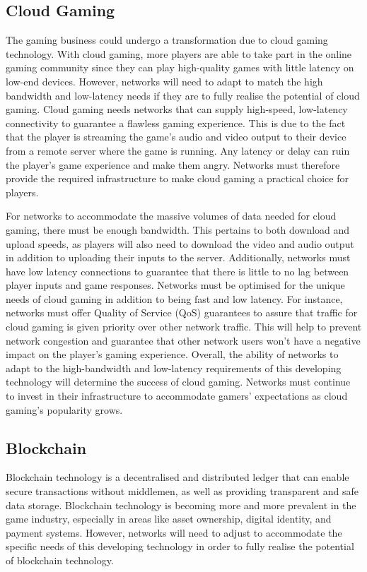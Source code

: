 \subsection{Cloud Gaming}
The gaming business could undergo a transformation due to cloud gaming technology. With cloud gaming, more players are able to take part in the online gaming community since they can play high-quality games with little latency on low-end devices. However, networks will need to adapt to match the high bandwidth and low-latency needs if they are to fully realise the potential of cloud gaming.\cite{lopezcloudgaming}
Cloud gaming needs networks that can supply high-speed, low-latency connectivity to guarantee a flawless gaming experience. This is due to the fact that the player is streaming the game's audio and video output to their device from a remote server where the game is running. Any latency or delay can ruin the player's game experience and make them angry. Networks must therefore provide the required infrastructure to make cloud gaming a practical choice for players.\cite{lopezcloudgaming}

For networks to accommodate the massive volumes of data needed for cloud gaming, there must be enough bandwidth. This pertains to both download and upload speeds, as players will also need to download the video and audio output in addition to uploading their inputs to the server. Additionally, networks must have low latency connections to guarantee that there is little to no lag between player inputs and game responses.\cite{lopezcloudgaming}
Networks must be optimised for the unique needs of cloud gaming in addition to being fast and low latency. For instance, networks must offer Quality of Service (QoS) guarantees to assure that traffic for cloud gaming is given priority over other network traffic. This will help to prevent network congestion and guarantee that other network users won't have a negative impact on the player's gaming experience.\cite{lopezcloudgaming}
Overall, the ability of networks to adapt to the high-bandwidth and low-latency requirements of this developing technology will determine the success of cloud gaming. Networks must continue to invest in their infrastructure to accommodate gamers' expectations as cloud gaming's popularity grows.\cite{lopezcloudgaming}

\subsection{Blockchain}
Blockchain technology is a decentralised and distributed ledger that can enable secure transactions without middlemen, as well as providing transparent and safe data storage. Blockchain technology is becoming more and more prevalent in the game industry, especially in areas like asset ownership, digital identity, and payment systems. However, networks will need to adjust to accommodate the specific needs of this developing technology in order to fully realise the potential of blockchain technology.\cite{blockchainNFT}

